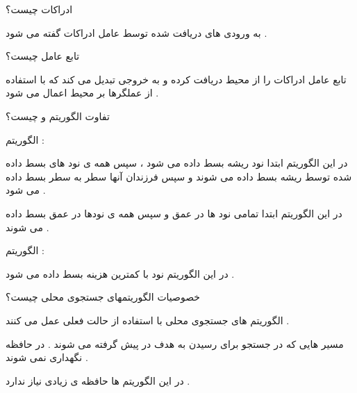 \documentclass[12pt]{article}
\begin{document}
\vspace{20pt}
\noindent
ادراکات چیست؟


\begin{tcolorbox}
به ورودی های دریافت شده توسط عامل ادراکات گفته می شود .
\end{tcolorbox}



\vspace{20pt}
\noindent
تابع عامل چیست؟

\begin{tcolorbox}
تابع عامل ادراکات را از محیط دریافت کرده و به خروجی تبدیل می کند که با استفاده از عملگرها بر محیط اعمال می شود .
\end{tcolorbox}


\vspace{20pt}
\noindent
تفاوت الگوریتم
 و 
 چیست؟


\begin{tcolorbox}
الگوریتم 
  : 
 
 در این الگوریتم ابتدا نود ریشه بسط داده می شود ، سپس همه ی نود های بسط داده شده توسط ریشه بسط داده می شوند و سپس فرزندان آنها سطر به سطر بسط داده می شود .
 
 در این الگوریتم ابتدا تمامی نود ها در عمق 
 و سپس همه ی نودها  در عمق
 بسط داده می شوند .
 
 
 \vspace{20pt}
 
 الگوریتم
   : 
  
  در این الگوریتم نود با کمترین هزینه بسط داده می شود .

\end{tcolorbox}



\vspace{20pt}
\noindent
خصوصیات الگوریتمهای جستجوی محلی چیست؟



\begin{tcolorbox}
الگوریتم های جستجوی محلی با استفاده از حالت فعلی عمل می کنند .

\vspace{20pt}

مسیر هایی که در جستجو برای رسیدن به هدف در پیش گرفته می شوند . در حافظه نگهداری نمی شوند .

\vspace{20pt}

در این الگوریتم ها حافظه ی زیادی نیاز ندارد .
\end{tcolorbox}
\end{document}
